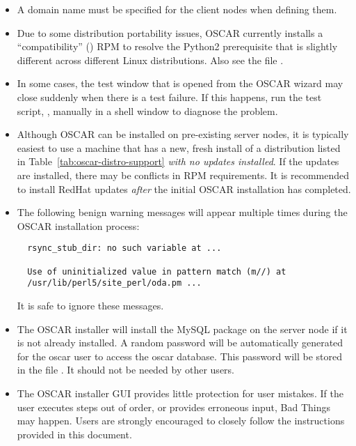 \begin{itemize}
\item A domain name must be specified for the client nodes when
  defining them.

\item Due to some distribution portability issues, OSCAR currently installs
  a ``compatibility''  () RPM to resolve the
  Python2 prerequisite that is slightly different across different Linux
  distributions.  Also see the file .

\item In some cases, the test window that is opened from the
  OSCAR wizard may close suddenly when there is a test failure. If
  this happens, run the test script, ,
  manually in a shell window to diagnose the problem.

\item Although OSCAR can be installed on pre-existing server nodes, it
  is typically easiest to use a machine that has a new, fresh install
  of a distribution listed in Table~\ref{tab:oscar-distro-support}
  {\em with no updates installed}.  If the updates are installed,
  there may be conflicts in RPM requirements.  It is recommended to
  install RedHat updates {\em after} the initial OSCAR installation has
  completed.

\item The following benign warning messages will appear multiple times
  during the OSCAR installation process:

\begin{verbatim}
  rsync_stub_dir: no such variable at ...

  Use of uninitialized value in pattern match (m//) at
  /usr/lib/perl5/site_perl/oda.pm ...
\end{verbatim}

  It is safe to ignore these messages.

\item The OSCAR installer will install the MySQL package on the server
  node if it is not already installed.  A random password will be automatically
\begchange
  generated for the oscar user to access the oscar database.  This
  password will be stored in the file .  It should
  not be needed by other users.
\endchange

\item The OSCAR installer GUI provides little protection for user
  mistakes.  If the user executes steps out of order, or provides
  erroneous input, Bad Things may happen.  Users are strongly
  encouraged to closely follow the instructions provided in this
  document.


\end{itemize}

